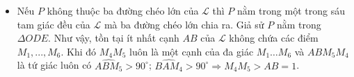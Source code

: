 \begin{ex}
{\begin{enumerate}
\begin{itemize}
   		\item Nếu $P$ không thuộc ba đường chéo lớn của $\mathscr{L}$ thì $P$ nằm trong một trong sáu tam giác đều của $\mathscr{L}$ mà ba đường chéo lớn chia ra. Giả sử $P$ nằm trong $\Delta ODE$. Như vậy, tồn tại ít nhất cạnh $AB$ của $\mathscr{L}$ không chứa các điểm $M_1,...,M_6$. Khi đó $M_4M_5$ luôn là một cạnh của đa giác $M_1\ldots M_6$ và $ABM_5M_4$ là tứ giác luôn có $\widehat{ABM_5}>90^\circ $; $\widehat{BAM_4}>90^\circ\Rightarrow M_4M_5>AB=1$.
   	\end{itemize}
   	\end{enumerate} }
\end{ex}

